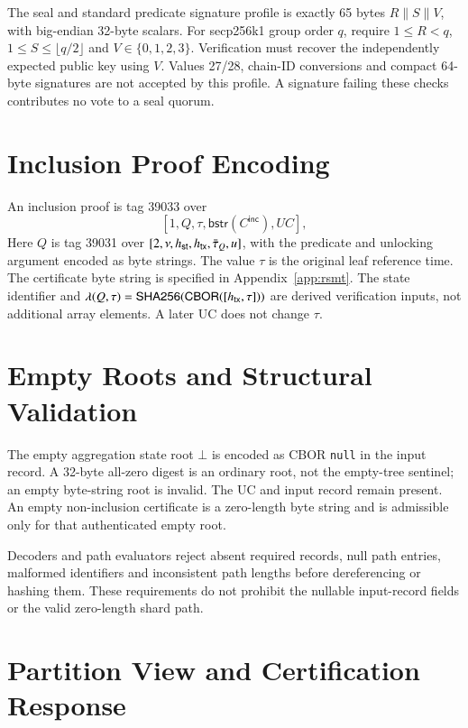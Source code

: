 The seal and standard predicate signature profile is exactly 65 bytes $R\|S\|V$, with big-endian 32-byte scalars. For secp256k1 group order $q$, require $1\le R<q$, $1\le S\le\lfloor q/2\rfloor$ and $V\in\{0,1,2,3\}$. Verification must recover the independently expected public key using $V$. Values 27/28, chain-ID conversions and compact 64-byte signatures are not accepted by this profile. A signature failing these checks contributes no vote to a seal quorum.


\section{Inclusion Proof Encoding}\label{sec:inclusion-encoding}

An inclusion proof is tag 39033 over
\[
[1,Q,\tau,\mathsf{bstr}(C^\mathsf{inc}),UC],
\]
Here $Q$ is tag 39031 over $[2,\nu,{h_\mathsf{st}},{h_\mathsf{tx}},\bar\tau_Q,u]$, with the predicate and unlocking argument encoded as byte strings. The value $\tau$ is the original leaf reference time. The certificate byte string is specified in Appendix~\ref{app:rsmt}. The state identifier and $\lambda(Q,\tau)=\mathsf{SHA256}(\mathsf{CBOR}([{h_\mathsf{tx}},\tau]))$ are derived verification inputs, not additional array elements. A later UC does not change $\tau$.


\section{Empty Roots and Structural Validation}\label{sec:empty-root-encoding}

The empty aggregation state root $\bot$ is encoded as CBOR \texttt{null} in the input record. A 32-byte all-zero digest is an ordinary root, not the empty-tree sentinel; an empty byte-string root is invalid. The UC and input record remain present. An empty non-inclusion certificate is a zero-length byte string and is admissible only for that authenticated empty root.

Decoders and path evaluators reject absent required records, null path entries, malformed identifiers and inconsistent path lengths before dereferencing or hashing them. These requirements do not prohibit the nullable input-record fields or the valid zero-length shard path.


\section{Partition View and Certification Response}\label{sec:partition-view-encoding}

